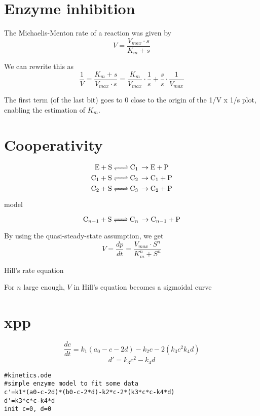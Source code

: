 \documentclass[10pt]{article}
\begin{document}
\section*{Enzyme inhibition}

The Michaelis-Menton rate of a reaction was given by \[ V = \frac{V_{max} \cdot s}{K_m + s} \]

We can rewrite this as \[ \frac{1}{V} = \frac{K_m + s}{V_{max} \cdot s} = \frac{K_m}{V_{max}}\cdot\frac{1}{s} + \frac{s}{s}\cdot\frac{1}{V_{max}} \]

The first term (of the last bit) goes to 0 close to the origin of the 1/V x 1/s plot, enabling the estimation of $K_m$.


\section*{Cooperativity}


\[ \ce{E + S <=> C_1 \rightarrow E + P} \]
\[ \ce{C_1 + S <=> C_2 \rightarrow C_1 + P} \]
\[ \ce{C_2 + S <=> C_3 \rightarrow C_2 + P} \]

model

\[ \ce{C_{n-1} + S <=> C_n \rightarrow C_{n-1} + P} \]

By using the quasi-steady-state assumption, we get \[ V = \frac{dp}{dt} = \frac{V_{max} \cdot S^{n}}{K^{n}_{m} + S^{n}} \]

Hill's rate equation

For $n$ large enough, $V$ in Hill's equation becomes a sigmoidal curve

\section*{xpp}

\[ \frac{dc}{dt} = k_1(a_0 - c - 2d) - k_2 c - 2(k_3 c^2  k_4 d) \]
\[ d' = k_3 c^2 - k_4 d \]

\begin{verbatim}
#kinetics.ode
#simple enzyme model to fit some data
c'=k1*(a0-c-2d)*(b0-c-2*d)-k2*c-2*(k3*c*c-k4*d)
d'=k3*c*c-k4*d
init c=0, d=0
\end{verbatim}
\end{document}
